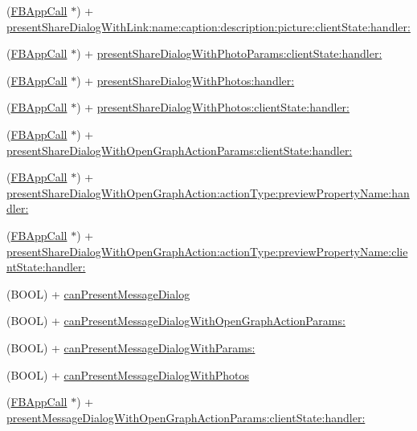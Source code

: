 \begin{DoxyCompactItemize}
\item 
(\hyperlink{interfaceFBAppCall}{F\+B\+App\+Call} $\ast$) + \hyperlink{interfaceFBDialogs_aaed28cb89925f451c2d8bab8f1b44e22}{present\+Share\+Dialog\+With\+Link\+:name\+:caption\+:description\+:picture\+:client\+State\+:handler\+:}
\item 
(\hyperlink{interfaceFBAppCall}{F\+B\+App\+Call} $\ast$) + \hyperlink{interfaceFBDialogs_ad8f870b0c951157f3f3c9de5f42031ae}{present\+Share\+Dialog\+With\+Photo\+Params\+:client\+State\+:handler\+:}
\item 
(\hyperlink{interfaceFBAppCall}{F\+B\+App\+Call} $\ast$) + \hyperlink{interfaceFBDialogs_aeaf0798a6057ed03c6a3cc26aa624a27}{present\+Share\+Dialog\+With\+Photos\+:handler\+:}
\item 
(\hyperlink{interfaceFBAppCall}{F\+B\+App\+Call} $\ast$) + \hyperlink{interfaceFBDialogs_abc4827f34c1e7e82b34216e6b9330cd8}{present\+Share\+Dialog\+With\+Photos\+:client\+State\+:handler\+:}
\item 
(\hyperlink{interfaceFBAppCall}{F\+B\+App\+Call} $\ast$) + \hyperlink{interfaceFBDialogs_a2fd765d39b1e4e4a9d4252762694b2b9}{present\+Share\+Dialog\+With\+Open\+Graph\+Action\+Params\+:client\+State\+:handler\+:}
\item 
(\hyperlink{interfaceFBAppCall}{F\+B\+App\+Call} $\ast$) + \hyperlink{interfaceFBDialogs_a17f88dc21a7f13474d310e4dd3e0d781}{present\+Share\+Dialog\+With\+Open\+Graph\+Action\+:action\+Type\+:preview\+Property\+Name\+:handler\+:}
\item 
(\hyperlink{interfaceFBAppCall}{F\+B\+App\+Call} $\ast$) + \hyperlink{interfaceFBDialogs_ad40b913195e68f5449fb0afab6c5a4b5}{present\+Share\+Dialog\+With\+Open\+Graph\+Action\+:action\+Type\+:preview\+Property\+Name\+:client\+State\+:handler\+:}
\item 
(B\+O\+OL) + \hyperlink{interfaceFBDialogs_aa41db27dd00b0c59e01d45f72b9045aa}{can\+Present\+Message\+Dialog}
\item 
(B\+O\+OL) + \hyperlink{interfaceFBDialogs_abc596dd117701ceb160dd63db514cf11}{can\+Present\+Message\+Dialog\+With\+Open\+Graph\+Action\+Params\+:}
\item 
(B\+O\+OL) + \hyperlink{interfaceFBDialogs_a81544299ca98179464ec34fc0e8d12b7}{can\+Present\+Message\+Dialog\+With\+Params\+:}
\item 
(B\+O\+OL) + \hyperlink{interfaceFBDialogs_ac10e310c30d763c7885c11fb44ac4924}{can\+Present\+Message\+Dialog\+With\+Photos}
\item 
(\hyperlink{interfaceFBAppCall}{F\+B\+App\+Call} $\ast$) + \hyperlink{interfaceFBDialogs_a5bca1ea62e067e9bdb417526be737bb7}{present\+Message\+Dialog\+With\+Open\+Graph\+Action\+Params\+:client\+State\+:handler\+:}

\end{DoxyCompactItemize}
